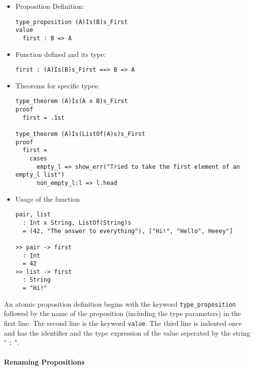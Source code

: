 \documentclass{article}
\begin{document}
\begin{itemize}
\begin{itemize}
\item Proposition Definition:

\begin{verbatim}
type_proposition (A)Is(B)s_First
value
  first : B => A
\end{verbatim}

\item Function defined and its type:

\begin{verbatim}
first : (A)Is(B)s_First ==> B => A
\end{verbatim}

\item Theorems for specific types:

\begin{verbatim}
type_theorem (A)Is(A x B)s_First
proof
  first = .1st

type_theorem (A)Is(ListOf(A)s)s_First
proof
  first =
    cases
      empty_l => show_err("Tried to take the first element of an empty_l list")
      non_empty_l:l => l.head
\end{verbatim}

\item Usage of the function
\begin{verbatim}
pair, list
  : Int x String, ListOf(String)s
  = (42, "The answer to everything"), ["Hi!", "Hello", Heeey"]

>> pair -> first
  : Int
  = 42
>> list -> first
  : String
  = "Hi!"
\end{verbatim}
\end{itemize}

An atomic proposition definition begins with the keyword
\texttt{type_proposition} followed by the name of the proposition (including
the type parameters) in the first line. The second line is the keyword
\texttt{value}. The third line is indented once and has the identifier and the
type expression of the value seperated by the string " \texttt{:} ".

\end{itemize}

\paragraph{Renaming Propositions}
\end{document}
